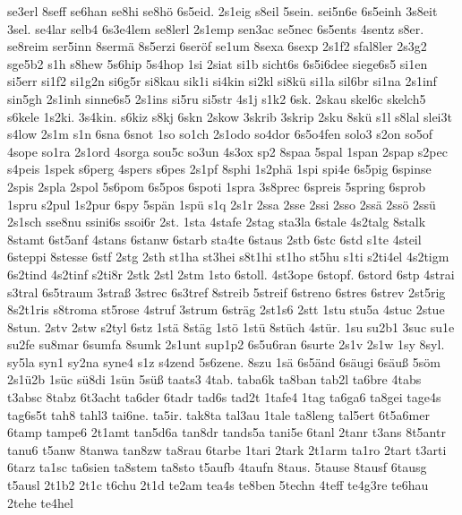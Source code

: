 {se3erl 8seff se6han se8hi se8h\"o 6s5eid.  2s1eig s8eil 5sein.
sei5n6e 6s5einh 3s8eit 3sel.  se4lar selb4 6s3e4lem se8lerl 2s1emp
sen3ac se5nec 6s5ents 4sentz s8er.  se8reim ser5inn 8serm\"a
8s5erzi 6ser\"of se1um 8sexa 6sexp 2s1f2 sfal8ler 2s3g2 sge5b2 s1h
s8hew 5s6hip 5s4hop 1si 2siat si1b sicht6s 6s5i6dee siege6s5 si1en
si5err si1f2 si1g2n si6g5r si8kau sik1i si4kin si2kl si8k\"u si1la
sil6br si1na 2s1inf sin5gh 2s1inh sinne6s5 2s1ins si5ru si5str 4s1j
s1k2 6sk.  2skau skel6c skelch5 s6kele 1s2ki.  3s4kin.  s6kiz s8kj
6skn 2skow 3skrib 3skrip 2sku 8sk\"u s1l s8lal slei3t s4low 2s1m
s1n 6sna 6snot 1so so1ch 2s1odo so4dor 6s5o4fen solo3 s2on so5of 4sope
so1ra 2s1ord 4sorga sou5c so3un 4s3ox sp2 8spaa 5spal 1span 2spap
s2pec s4peis 1spek s6perg 4spers s6pes 2s1pf 8sphi 1s2ph\"a 1spi
spi4e 6s5pig 6spinse 2spis 2spla 2spol 5s6pom 6s5pos 6spoti 1spra
3s8prec 6spreis 5spring 6sprob 1spru s2pul 1s2pur 6spy 5sp\"an
1sp\"u s1q 2s1r 
2ssa 2sse 2ssi 2sso 2ss\"a 2ss\"o 2ss\"u 2s1sch 
sse8nu ssini6s ssoi6r 2st.  
1sta 4stafe 2stag 
sta3la 6stale 
4s2talg 
8stalk 8stamt 6st5anf 4stans 6stanw 6starb sta4te
6staus 2stb 6stc 6std 
s1te %
4steil 
6steppi 
8stesse 6stf 2stg 2sth st1ha st3hei s8t1hi st1ho st5hu 
s1ti %
s2ti4el %
4s2tigm 
6s2tind %
4s2tinf 
s2ti8r 
2stk 2stl 2stm 
1sto 6stoll.  4st3ope
6stopf. 6stord 6stp 
4strai 
s3tral %
6s5traum 3stra\ss 
 3strec 6s3tref 8streib 5streif 6streno 6stres 6strev 
2st5rig
8s2t1ris %
s8troma st5rose 4struf 3strum
6str\"ag 2st1s6 2stt 
1stu stu5a 4stuc 2stue 8stun.  2stv 2stw s2tyl
6stz 1st\"a 8st\"ag 
1st\"o
1st\"u 8st\"uch 4st\"ur.
1su su2b1 3suc su1e su2fe su8mar 6sumfa 8sumk 2s1unt sup1p2 6s5u6ran
6surte 2s1v 2s1w 1sy 8syl.  sy5la syn1 sy2na syne4 s1z s4zend 5s6zene.
8szu 1s\"a 6s5\"and 6s\"augi 6s\"au\ss 
5s\"om 2s1\"u2b 1s\"uc s\"u8di 1s\"un 5s\"u\ss
 taats3 4tab.  taba6k ta8ban tab2l ta6bre 4tabs t3absc
8tabz 6t3acht ta6der 6tadr tad6s tad2t 1tafe4 1tag ta6ga6 ta8gei
tage4s tag6s5t tah8 tahl3 tai6ne.  ta5ir.  tak8ta tal3au 1tale ta8leng
tal5ert 6t5a6mer 6tamp tampe6 2t1amt tan5d6a tan8dr tands5a tani5e
6tanl 2tanr t3ans 8t5antr tanu6 t5anw 8tanwa tan8zw ta8rau 6tarbe
1tari 2tark 2t1arm ta1ro 2tart t3arti 6tarz ta1sc ta6sien ta8stem
ta8sto t5aufb 4taufn 8taus.  5tause 8tausf 6tausg t5ausl 2t1b2 2t1c
t6chu 2t1d te2am tea4s te8ben 5techn 4teff te4g3re te6hau 2tehe te4hel
}
